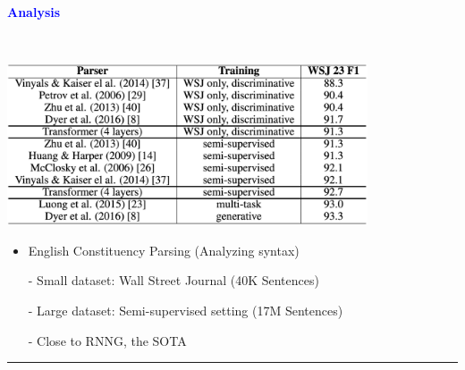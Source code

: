 \documentclass[professionalfont]{beamer}
\begin{document}
\begin{frame}
\begin{refsection}

\begin{center}
    { \textbf{\textcolor{blue}{ {\fontsize{12}{14}\selectfont Analysis} }} }
\end{center}
\\[0.2cm]

\begin{center}
    \includegraphics[width=0.8\textwidth]{table/4.png}
\end{center}

{\fontsize{10}{14}\selectfont 
\begin{itemize}
    \item English Constituency Parsing (Analyzing syntax)

    - Small dataset: Wall Street Journal (40K Sentences)

    - Large dataset: Semi-supervised setting (17M Sentences)

    - Close to RNNG, the SOTA \cite{RNNG}

\end{itemize}
}

\vspace{0.2cm}
\hrule
\printbibliography

\end{refsection}
\end{frame}
\end{document}
